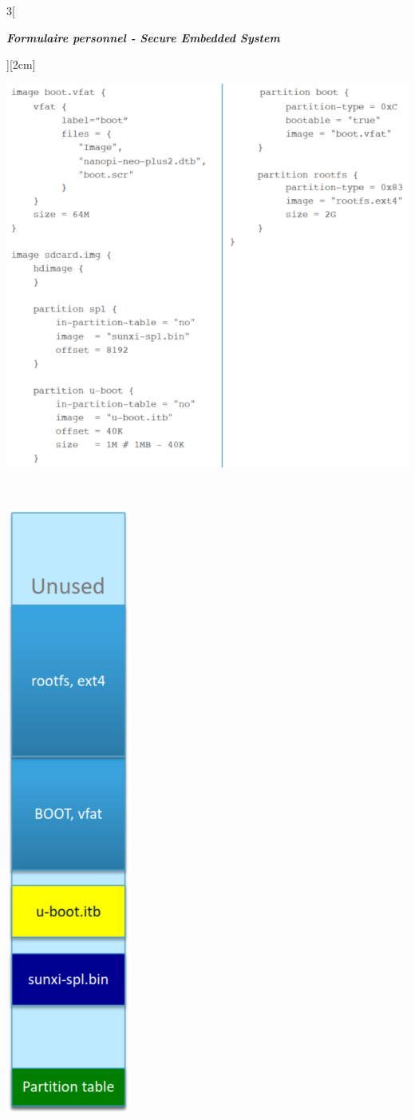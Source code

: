 \begin{multicols}{3}[\centerline{ \large\em \textbf{Formulaire personnel - Secure Embedded System}}][2cm]
\begin{minipage}{\linewidth}
	\centering
    \includegraphics[width =1\columnwidth]{images/52.png}
\end{minipage}\\
\begin{minipage}{\linewidth}
	\centering
    \includegraphics[width =0.2\columnwidth, angle = 90]{images/58.png}

\end{minipage}
\end{multicols}
